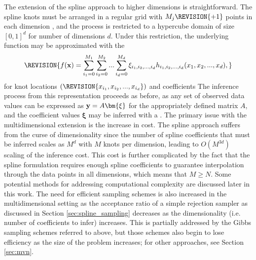 The extension of the spline approach to higher dimensions is straightforward. The spline knots must be arranged in a regular grid with $M_j \REVISION{+ 1}$ points in each dimension , and the process is restricted to a hypercube domain of size $[0,1]^d$ for number of dimensions $d$. Under this restriction, the underlying function may be approximated with the 
\begin{equation}
\REVISION{
f(\mathbf{x}) = \sum_{i_1=0}^{M_{1}} \sum_{i_2=0}^{M_{2}} ... \sum_{i_d=0}^{M_{d}} \xi_{i_1, i_2, ..., i_d} h_{i_1, i_2, ..., i_d} 
(x_{1}, x_{2}, ..., x_{d}),
}
\end{equation}
for knot locations $(\REVISION{x_{i_1}, x_{i_2}, ..., x_{i_d}})$ and coefficients  The inference process from this representation proceeds as before, as any set of observed data values can be expressed as $\bold{y}=A\bm{\xi}$ for the appropriately defined matrix $A$, and the coefficient values $\bm{\xi}$ may be inferred with a . 
The primary issue with the multidimensional extension is the increase in cost. The spline approach suffers from the curse of dimensionality since the number of spline coefficients that must be inferred scales as $M^d$ with $M$ knots per dimension, leading to $O(M^{3d})$ scaling of the inference cost. This cost is further complicated by the fact that the spline formulation requires enough spline coefficients to guarantee interpolation through the data points in all dimensions, which means that $M\geq N$. Some potential methods for addressing computational complexity are discussed later in this work.
The need for efficient sampling schemes is also increased in the multidimensional setting as the acceptance ratio of a simple rejection sampler as discussed in Section \ref{sec:spline_sampling} decreases as the dimensionality (i.e. number of coefficients to infer) increases. This is partially addressed by the Gibbs sampling schemes referred to above, but those schemes also begin to lose efficiency as the size of the problem increases; for other approaches, see Section \ref{sec:mvn}.

